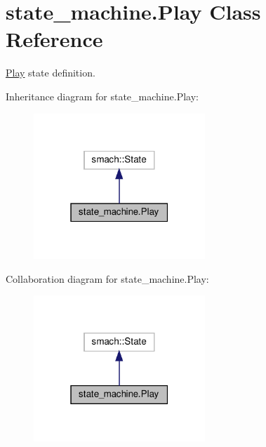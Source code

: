 \hypertarget{classstate__machine_1_1Play}{}\section{state\+\_\+machine.\+Play Class Reference}
\label{classstate__machine_1_1Play}


\hyperlink{classstate__machine_1_1Play}{Play} state definition.  




Inheritance diagram for state\+\_\+machine.\+Play\+:
\nopagebreak
\begin{figure}[H]
\begin{center}
\leavevmode
\includegraphics[width=183pt]{classstate__machine_1_1Play__inherit__graph}
\end{center}
\end{figure}


Collaboration diagram for state\+\_\+machine.\+Play\+:
\nopagebreak
\begin{figure}[H]
\begin{center}
\leavevmode
\includegraphics[width=183pt]{classstate__machine_1_1Play__coll__graph}
\end{center}
\end{figure}
